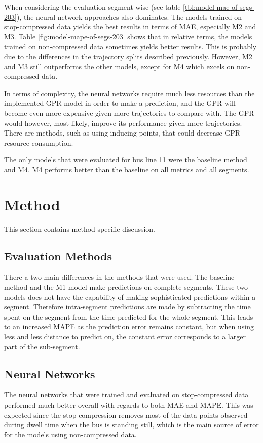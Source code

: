 When considering the evaluation segment-wise (see table \ref{tbl:model-mae-of-segs-203}), the neural network approaches also dominates. The models trained on stop-compressed data yields the best results in terms of MAE, especially M2 and M3. Table \ref{fig:model-mape-of-segs-203} shows that in relative terms, the models trained on non-compressed data sometimes yields better results. This is probably due to the differences in the trajectory splits described previously. However, M2 and M3 still outperforms the other models,  except for M4 which excels on non-compressed data.

In terms of complexity, the neural networks require much less resources than the implemented GPR model in order to make a prediction, and the GPR will become even more expensive given more trajectories to compare with. The GPR would however, most likely, improve its performance given more trajectories. There are methods, such as using inducing points, that could decrease GPR resource consumption.

The only models that were evaluated for bus line 11 were the baseline method and M4. M4 performs better than the baseline on all metrics and all segments. 

\section{Method}
This section contains method specific discussion.

\label{sec:discussion-method}
\subsection{Evaluation Methods}
There a two main differences in the methods that were used. The baseline method and the M1 model make predictions on complete segments. These two models does not have the capability of making sophisticated predictions within a segment. Therefore intra-segment predictions are made by subtracting the time spent on the segment from the time predicted for the whole segment. This leads to an increased MAPE as the prediction error remains constant, but when using less and less distance to predict on, the constant error corresponds to a larger part of the sub-segment.

\subsection{Neural Networks}
The neural networks that were trained and evaluated on stop-compressed data performed much better overall with regards to both MAE and MAPE. This was expected since the stop-compression removes most of the data points observed during dwell time when the bus is standing still, which is the main source of error for the models using non-compressed data. 

